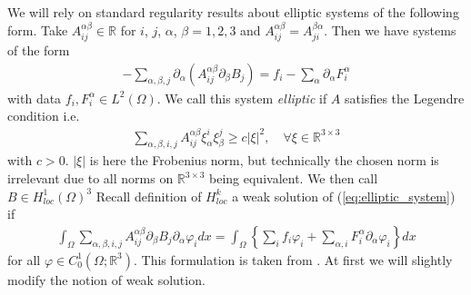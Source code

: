 \documentclass[12pt,a4paper]{article}
\numberwithin{equation}{subsection}
\numberwithin{lemma}{subsection}
\theoremstyle{definition}
\newcommand{\real}{\mathbb{R}}
\begin{document}
We will rely on standard regularity results about elliptic systems 
of the following form. Take $A_{ij}^{\alpha \beta} \in \real$
for $i$, $j$, $\alpha$, $\beta = 1,2,3$ and 
$A_{ij}^{\alpha \beta} = A_{ji}^{\beta \alpha}$. Then we have systems of the 
form 
\begin{align}
    -\sum\limits_{\alpha, \beta, j} \partial_\alpha 
        (A_{ij}^{\alpha \beta} \partial_\beta B_j)
    = f_i - \sum\limits_\alpha \partial_\alpha F_i^\alpha
    \label{eq:elliptic_system}
\end{align}
with data $f_i, F_i^\alpha \in L^2(\Omega)$. We call this system 
\textit{elliptic} if $A$ satisfies the Legendre condition i.e.
\begin{align}
    \sum_{\alpha,\beta,i,j}A_{ij}^{\alpha \beta} \xi_\alpha^i \xi_\beta^j
    \geq c |\xi|^2, \quad \forall \xi \in \real^{3 \times 3} 
    \label{eq:legendre_condition}
\end{align}
with $c > 0$. $|\xi|$ is here the Frobenius norm, but technically the chosen 
norm is irrelevant due to all norms on $\real^{3 \times 3}$ being equivalent.
We then call $B \in H^1_{loc}(\Omega)^3$ {\color{red} Recall definition 
of $H^k_{loc}$} a weak solution
of (\ref{eq:elliptic_system}) if 
\begin{align}
    \int_\Omega \sum\limits_{\alpha,\beta,i,j} 
        A_{ij}^{\alpha \beta} \partial_\beta B_j \partial_\alpha \varphi_i dx
    = \int_\Omega \left\{ \sum\limits_i f_i \varphi_i + 
        \sum\limits_{\alpha,i} F_i^\alpha \partial_\alpha \varphi_i \right\} dx
    \label{eq:weak_elliptic_system}
\end{align}
for all $\varphi \in C^1_0(\Omega;\real^3)$. This formulation is taken from 
\cite[Sec. 1.3]{lectures_on_elliptic_pdes}. At first we will slightly modify
the notion of weak solution. 
\end{document}
